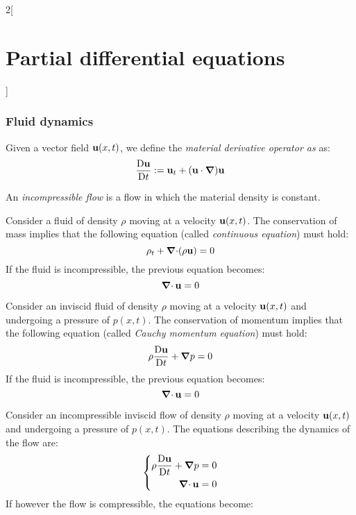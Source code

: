 \documentclass[../../../main.tex]{subfiles}
\begin{document}
\begin{multicols}{2}[\section{Partial differential equations}]
  \subsubsection{Fluid dynamics}
  \begin{definition}
    Given a vector field $\boldsymbol{\mathrm{u}}(x,t)$, we define the \emph{material derivative operator as} as: $$\frac{\mathrm{D}\boldsymbol{\mathrm{u}}}{\mathrm{D}t}:=\boldsymbol{\mathrm{u}}_t+(\boldsymbol{\mathrm{u}}\cdot\grad)\boldsymbol{\mathrm{u}}$$
  \end{definition}
  \begin{definition}
    An \emph{incompressible flow} is a flow in which the material density is constant.
  \end{definition}
  \begin{proposition}
    Consider a fluid of density $\rho$ moving at a velocity $\boldsymbol{\mathrm{u}}(x,t)$. The conservation of mass implies that the following equation (called \emph{continuous equation}) must hold:
    \begin{equation}\label{PDE_continuous}
      \rho_t+\operatorname{\boldsymbol{\mathrm{\nabla}}\cdot}(\rho\boldsymbol{\mathrm{u}})=0
    \end{equation}
    If the fluid is incompressible, the previous equation becomes: $$\operatorname{\boldsymbol{\mathrm{\nabla}}\cdot}{\boldsymbol{\mathrm{u}}}=0$$
  \end{proposition}
  \begin{proposition}
    Consider an inviscid fluid of density $\rho$ moving at a velocity $\boldsymbol{\mathrm{u}}(x,t)$ and undergoing a pressure of $p(x,t)$. The conservation of momentum implies that the following equation (called \emph{Cauchy momentum equation}) must hold:
    \begin{equation}\label{PDE_cauchy}
      \rho\frac{\mathrm{D}\boldsymbol{\mathrm{u}}}{\mathrm{D}t}+\grad p=0
    \end{equation}
    If the fluid is incompressible, the previous equation becomes: $$\operatorname{\boldsymbol{\mathrm{\nabla}}\cdot}{\boldsymbol{\mathrm{u}}}=0$$
  \end{proposition}
  \begin{theorem}
    Consider an incompressible inviscid flow of density $\rho$ moving at a velocity $\boldsymbol{\mathrm{u}}(x,t)$ and undergoing a pressure of $p(x,t)$. The equations describing the dynamics of the flow are:
    \begin{equation*}
      \left\{
      \begin{aligned}
        \rho\frac{\mathrm{D}\boldsymbol{\mathrm{u}}}{\mathrm{D}t}+\grad p & =0 \\
        \operatorname{\boldsymbol{\mathrm{\nabla}}\cdot}{\boldsymbol{\mathrm{u}}}                 & =0
      \end{aligned}
      \right.
    \end{equation*}
    If however the flow is compressible, the equations become:

\end{theorem}
\end{multicols}
\end{document}
